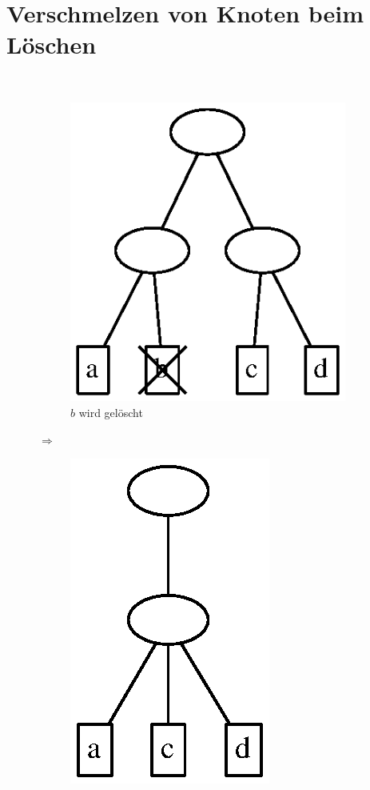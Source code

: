 \section{Verschmelzen von Knoten beim Löschen}
$ $
\begin{figure}[H]
	\centering
	\begin{subfigure}[H]{0.4\linewidth}
		\centering
		\includegraphics[width=\linewidth]{12/Grafik/graph6}
		\caption{$b$ wird gelöscht}
		\label{fig:graph6}
	\end{subfigure}
	{\Huge $\Rightarrow$}
	\begin{subfigure}[H]{0.4\linewidth}
		\centering
		\includegraphics[width=0.675\linewidth]{12/Grafik/graph7}

\end{subfigure}
\end{figure}
